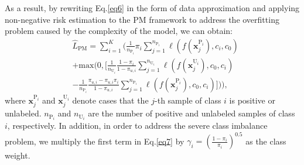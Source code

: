 \documentclass[11pt]{article}
\begin{document}
As a result, by rewriting Eq.\ref{eq6} in the form of data approximation and applying non-negative risk estimation \citep{NIPS2017_7cce53cf} to the PM framework to address the overfitting problem caused by the complexity of the model, we can obtain:
\begin{equation}
\begin{aligned}\label{eq7}
&\widehat{L}_{\mathrm{PM}}=\sum_{i=1}^{K}( \frac{1}{n_{\mathrm{P}_{i}}}\pi_{i} \sum_{j=1}^{n_{\mathrm{P}_{i}}}\ell(f(\boldsymbol{x}_{j}^{\mathrm{P}_{i}}), c_{i}, c_{0}) \\&+\mathrm{max}(0, [\frac{1}{n_{\mathrm{U}_{i}}} \frac{1-\pi_{i}}{1-\pi_{u,i}} \sum_{j=1}^{n_{\mathrm{U}_{i}}} \ell(f(\boldsymbol{x}_{j}^{\mathrm{U}_{i}}), c_{0}, c_{i})\\&-\frac{1}{n_{\mathrm{P}_{i}}}\frac{\pi_{u,i}-\pi_{u,i} \pi_{i}}{1-\pi_{u,i}} \sum_{j=1}^{n_{\mathrm{P}_{i}}}\ell(f(\boldsymbol{x}_{j}^{\mathrm{P}_{i}}), c_{0}, c_{i})])),
\end{aligned}
\end{equation}
where $\boldsymbol{x}_{j}^{\mathrm{P}_{i}}$ and $\boldsymbol{x}_{j}^{\mathrm{U}_{i}}$ denote cases that the $j$-th sample of class $i$ is positive or unlabeled. $n_{\mathrm{P}_{i}}$ and $n_{\mathrm{U}_{i}}$ are the number of positive and unlabeled samples of class $i$, respectively. In addition, in order to address the severe class imbalance problem, we multiply the first term in Eq.\ref{eq7} by $\gamma_{i}=(\frac{1-\pi_{i}}{\pi_{i}})^{0.5}$ as the class weight.
\end{document}
